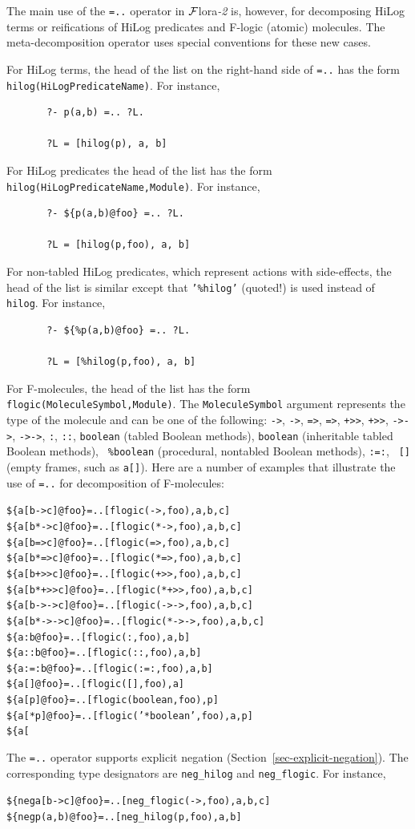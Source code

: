 \documentclass[11pt]{article}
\newcommand{\FLORA}{{\mbox{\sc ${\cal F}${lora}\rm\emph{-2}}}\xspace}
\begin{document}
The main use of the {\tt =..} operator in \FLORA is, however, for
decomposing HiLog terms or reifications of HiLog predicates and F-logic
(atomic) molecules. The meta-decomposition operator uses special
conventions for these new cases.

For HiLog terms, the head of the list on the right-hand side of {\tt =..}
has the form {\tt hilog(HiLogPredicateName)}. For instance, 
\begin{verbatim}
       ?- p(a,b) =.. ?L.
 
       ?L = [hilog(p), a, b]
\end{verbatim}
For HiLog predicates the head of the list has the form {\tt
  hilog(HiLogPredicateName,Module)}. For instance,
\begin{verbatim}
       ?- ${p(a,b)@foo} =.. ?L.
 
       ?L = [hilog(p,foo), a, b]
\end{verbatim}
For non-tabled HiLog predicates, which represent actions with side-effects,
the head of the list is similar except that {\tt '\%hilog'} (quoted!) is 
used instead of {\tt hilog}.  For instance,
\begin{verbatim}
       ?- ${%p(a,b)@foo} =.. ?L.
 
       ?L = [%hilog(p,foo), a, b]
\end{verbatim}

For F-molecules, the head of the list has the form
{\tt flogic(MoleculeSymbol,Module)}. The {\tt MoleculeSymbol} argument
represents the type of the molecule and can be one of the following:
{\tt ->}, {\tt *->}, {\tt =>}, {\tt *=>}, {\tt +>>}, {\tt *+>>}, {\tt ->->},
{\tt *->->}, {\tt :}, {\tt ::}, {\tt boolean} (tabled Boolean methods),
{\tt *boolean} (inheritable tabled Boolean methods), {\tt 
  \%boolean} (procedural, nontabled Boolean methods), {\tt :=:}, {\tt
  []} (empty frames, such as {\tt a[]}). Here are a number of examples
that illustrate the use of {\tt =..} for decomposition of F-molecules:
\begin{alltt}
    \$\{a[b->c]@foo\} =.. [flogic(->,foo), a, b, c]
    \$\{a[b*->c]@foo\} =.. [flogic(*->,foo), a, b, c]
    \$\{a[b=>c]@foo\} =.. [flogic(=>,foo), a, b, c]
    \$\{a[b*=>c]@foo\} =.. [flogic(*=>,foo), a, b, c]
    \$\{a[b+>>c]@foo\} =.. [flogic(+>>,foo), a, b, c]
    \$\{a[b*+>>c]@foo\} =.. [flogic(*+>>,foo), a, b, c]
    \$\{a[b->->c]@foo\} =.. [flogic(->->,foo), a, b, c]
    \$\{a[b*->->c]@foo\} =.. [flogic(*->->,foo), a, b, c]
    \$\{a:b@foo\} =.. [flogic(:,foo), a, b]
    \$\{a::b@foo\} =.. [flogic(::,foo), a, b]
    \$\{a:=:b@foo\} =.. [flogic(:=:,foo), a, b]
    \$\{a[]@foo\} =.. [flogic([],foo), a]
    \$\{a[p]@foo\} =.. [flogic(boolean,foo), p]
    \$\{a[*p]@foo\} =.. [flogic('*boolean',foo), a, p]
    \$\{a[%
\end{alltt}
The {\tt =..} operator supports explicit negation
(Section~\ref{sec-explicit-negation}). The corresponding 
type designators are {\tt neg\_hilog} and {\tt neg\_flogic}. For instance,
\begin{alltt}
     \$\{neg a[b->c]@foo\} =.. [neg_flogic(->,foo), a, b, c]
     \$\{neg p(a,b)@foo\} =.. [neg_hilog(p,foo), a, b]
\end{alltt}
\end{document}
